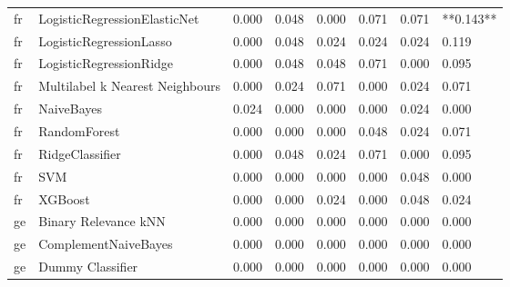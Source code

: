 \begin{tabular}{llllllll}
      fr &    LogisticRegressionElasticNet &     0.000 &                     0.048 &                 0.000 &                  0.071 &                                   0.071 & **0.143** \\
      fr &         LogisticRegressionLasso &     0.000 &                     0.048 &                 0.024 &                  0.024 &                                   0.024 &     0.119 \\
      fr &         LogisticRegressionRidge &     0.000 &                     0.048 &                 0.048 &                  0.071 &                                   0.000 &     0.095 \\
      fr & Multilabel k Nearest Neighbours &     0.000 &                     0.024 &                 0.071 &                  0.000 &                                   0.024 &     0.071 \\
      fr &                      NaiveBayes &     0.024 &                     0.000 &                 0.000 &                  0.000 &                                   0.024 &     0.000 \\
      fr &                    RandomForest &     0.000 &                     0.000 &                 0.000 &                  0.048 &                                   0.024 &     0.071 \\
      fr &                 RidgeClassifier &     0.000 &                     0.048 &                 0.024 &                  0.071 &                                   0.000 &     0.095 \\
      fr &                             SVM &     0.000 &                     0.000 &                 0.000 &                  0.000 &                                   0.048 &     0.000 \\
      fr &                         XGBoost &     0.000 &                     0.000 &                 0.024 &                  0.000 &                                   0.048 &     0.024 \\
      ge &            Binary Relevance kNN &     0.000 &                     0.000 &                 0.000 &                  0.000 &                                   0.000 &     0.000 \\
      ge &            ComplementNaiveBayes &     0.000 &                     0.000 &                 0.000 &                  0.000 &                                   0.000 &     0.000 \\
      ge &                Dummy Classifier &     0.000 &                     0.000 &                 0.000 &                  0.000 &                                   0.000 &     0.000 \\

\end{tabular}
